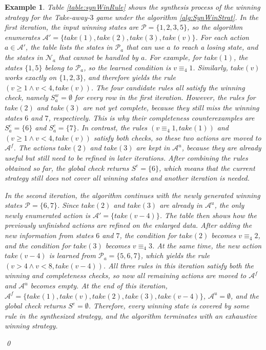 \documentclass[review]{elsarticle}
\newcommand{\positiveSet}{\mathcal{P}}
\newcommand{\negativeSet}{\mathcal{N}}
\newcommand{\act}{\mathcal{A}}
\newcommand{\modulo}{\equiv}
\newtheorem{example}{Example}
\begin{document}
\begin{example} \rm
    {\color{red}Table \ref{table:synWinRule} shows the synthesis process of the winning strategy for the Take-away-$3$ game under the algorithm \ref{alg:SynWinStrat}. 
	In the first iteration, the input winning states are $\positiveSet = \{1, 2, 3, 5\}$, so the algorithm enumerates $\act' = \{take(1), take(2), take(3), take(v)\}$.
	For each action $a \in \act'$, the table lists the states in $\positiveSet_a$ that can use $a$ to reach a losing state, and the states in $\negativeSet_a$ that cannot be handled by $a$.
	For example, for $take(1)$, the states $\{1, 5\}$ belong to $\positiveSet_a$, so the learned condition is $v \modulo_4 1$.
	Similarly, $take(v)$ works exactly on $\{1, 2, 3\}$, and therefore yields the rule $(v \geq 1 \land v < 4, take(v))$.
	The four candidate rules all satisfy the winning check, namely $S^w_a = \emptyset$ for every row in the first iteration.
	However, the rules for $take(2)$ and $take(3)$ are not yet complete, because they still miss the winning states $6$ and $7$, respectively.
	This is why their completeness counterexamples are $S^c_a = \{6\}$ and $S^c_a = \{7\}$.
	In contrast, the rules $(v \modulo_4 1, take(1))$ and $(v \geq 1 \land v < 4, take(v))$ satisfy both checks, so these two actions are moved to $\act^f$.
	The actions $take(2)$ and $take(3)$ are kept in $\act^u$, because they are already useful but still need to be refined in later iterations.
	After combining the rules obtained so far, the global check returns $S^e = \{6\}$, which means that the current strategy still does not cover all winning states and another iteration is needed.

    In the second iteration, the algorithm continues with the newly generated winning states $\positiveSet = \{6, 7\}$.
	Since $take(2)$ and $take(3)$ are already in $\act^u$, the only newly enumerated action is $\act' = \{take(v - 4)\}$.
	The table then shows how the previously unfinished actions are refined on the enlarged data.
	After adding the new information from states $6$ and $7$, the condition for $take(2)$ becomes $v \modulo_4 2$, and the condition for $take(3)$ becomes $v \modulo_4 3$.
	At the same time, the new action $take(v - 4)$ is learned from $\positiveSet_a = \{5, 6, 7\}$, which yields the rule $(v > 4 \land v < 8, take(v - 4))$.
	All three rules in this iteration satisfy both the winning and completeness checks, so now all remaining actions are moved to $\act^f$ and $\act^u$ becomes empty.
	At the end of this iteration, $\act^f = \{take(1), take(v), take(2), take(3), take(v - 4)\}$, $\act^u = \emptyset$, and the global check returns $S^e = \emptyset$.
	Therefore, every winning state is covered by some rule in the synthesized strategy, and the algorithm terminates with an exhaustive winning strategy.} \qed
\end{example}	
\end{document}
